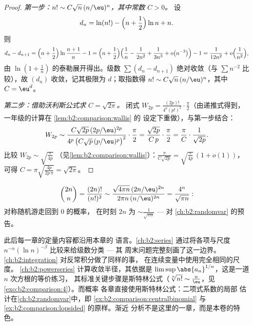 \begin{proof}
\emph{第一步：$n! \sim C \sqrt n\, (n/\eu)^n$，其中常数 $C >
0$。} 设
\[
d_n = \ln(n!) - \Bigl(n + \frac12\Bigr)\ln n + n .
\]
则
\[
d_n - d_{n+1}
= \Bigl(n + \frac12\Bigr) \ln\frac{n+1}{n} - 1
= \Bigl(n + \frac12\Bigr)\Bigl(\frac1n - \frac{1}{2n^2} +
\frac{1}{3n^3} + o\bigl(n^{-3}\bigr)\Bigr) - 1
= \frac{1}{12n^2} + o\Bigl(\frac{1}{n^2}\Bigr),
\]
由 $\ln(1 + \frac1n)$ 的泰勒展开得出。级数 $\sum (d_n
- d_{n+1})$ 绝对收敛（与 $\sum
n^{-2}$ 比较），故 $(d_n)$ 收敛，记其极限为 $d$；取指数得 $n! \sim
C\sqrt n\,(n/\eu)^n$，其中 $C = \eu^{d}$。

\emph{第二步：借助沃利斯公式求 $C = \sqrt{2\pi}$。} 闭式 $W_{2p}
= \frac{(2p)!}{4^p (p!)^2}\cdot\frac\pi2$（由递推式得到，
一年级的计算在 \cref{lem:b2:comparison:wallis} 的
设定下重做），与第一步结合：
\[
W_{2p} \sim \frac{C\sqrt{2p}\,(2p/\eu)^{2p}}
{4^p\,\bigl(C\sqrt p\,(p/\eu)^p\bigr)^2}\cdot\frac{\pi}{2}
= \frac{\sqrt{2p}}{C\,p}\cdot\frac{\pi}{2}
= \frac{\pi}{C}\cdot\frac{1}{\sqrt{2p}} .
\]
比较 $W_{2p} \sim \sqrt{\frac{\pi}{4p}}$
（见\cref{lem:b2:comparison:wallis}）：$\frac{\pi}{C\sqrt{2p}} =
\sqrt{\frac{\pi}{4p}}\,(1 + o(1))$，可得 $C = \pi
\sqrt{\frac{4p}{2p\,\pi}} = \sqrt{2\pi}$。
\end{proof}

\begin{example}[中心二项式系数]\label{ex:b2:comparison:centralbinomial}
\[
\binom{2n}{n} = \frac{(2n)!}{(n!)^2}
\sim \frac{\sqrt{4\pi n}\,(2n/\eu)^{2n}}{2\pi n\,(n/\eu)^{2n}}
= \frac{4^n}{\sqrt{\pi n}} :
\]
对称随机游走回到 $0$ 的概率，
在时刻 $2n$ 为 $\sim \frac{1}{\sqrt{\pi n}}$ --- 对
\cref{ch:b2:randomvar} 的预告。
\end{example}

\begin{remark}[本卷内的展望]\label{rem:b2:comparison:perspectives}
此后每一章的定量内容都沿用本章的
语言。\cref{ch:b2:series} 通过将各项与尺度
$n^{-\alpha}(\ln n)^{-\beta}$ 比较来给级数分类 --- 其
周末问题完整刻画了这一边界。
\cref{ch:b2:integration} 对反常积分做了同样的事，
在连续变量中使用完全相同的尺度。
\cref{ch:b2:powerseries} 计算收敛半径，其依据是
$\limsup\abs{a_n}^{1/n}$，这是一道 $n$ 次方根的等价练习，
其标准关键步骤是斯特林公式（$\sqrt[n]{n!}
\sim \frac n\eu$，见\cref{exo:b2:comparison:4}）。而概率
各章直接使用斯特林公式：二项式系数的局部
估计在\cref{ch:b2:randomvar}中，即
\cref{ex:b2:comparison:centralbinomial} 与
\cref{ex:b2:comparison:lopsided} 的原样。渐近
分析不是这里的一章，而是本卷的特色。
\end{remark}

